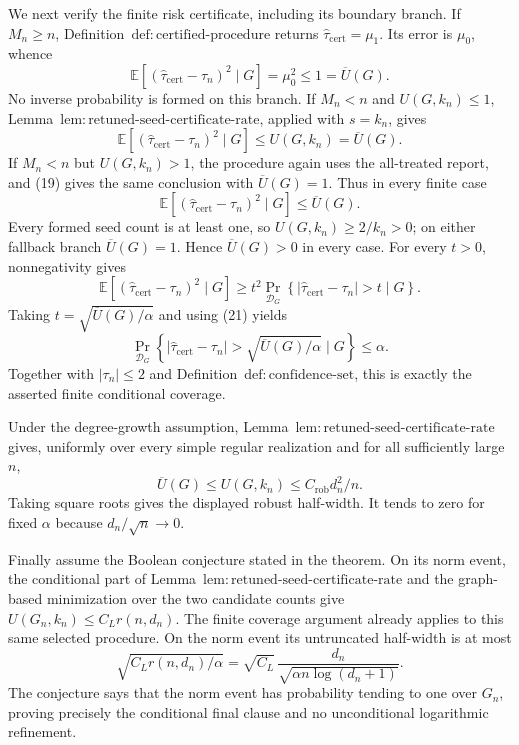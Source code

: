 We next verify the finite risk certificate, including its boundary branch.  If \(M_n\ge n\), Definition~\(\mathrm{def{:}certified\mbox{-}procedure}\) returns \(\widehat\tau_{\mathrm{cert}}=\mu_1\).  Its error is \(\mu_0\), whence
\[
\mathbb E[(\widehat\tau_{\mathrm{cert}}-\tau_n)^2\mid G]
=\mu_0^2\le1=\overline U(G).
\tag{19}
\]
No inverse probability is formed on this branch.  If \(M_n<n\) and \(U(G,k_n)\le1\), Lemma~\(\mathrm{lem{:}retuned\mbox{-}seed\mbox{-}certificate\mbox{-}rate}\), applied with \(s=k_n\), gives
\[
\mathbb E[(\widehat\tau_{\mathrm{cert}}-\tau_n)^2\mid G]
\le U(G,k_n)=\overline U(G).
\tag{20}
\]
If \(M_n<n\) but \(U(G,k_n)>1\), the procedure again uses the all-treated report, and (19) gives the same conclusion with \(\overline U(G)=1\).  Thus in every finite case
\[
\mathbb E[(\widehat\tau_{\mathrm{cert}}-\tau_n)^2\mid G]
\le\overline U(G).
\tag{21}
\]
Every formed seed count is at least one, so \(U(G,k_n)\ge2/k_n>0\); on either fallback branch \(\overline U(G)=1\).  Hence \(\overline U(G)>0\) in every case.
For every \(t>0\), nonnegativity gives
\[
\mathbb E[(\widehat\tau_{\mathrm{cert}}-\tau_n)^2\mid G]
\ge t^2\Pr_{\mathcal D_G}\!\left\{
|\widehat\tau_{\mathrm{cert}}-\tau_n|>t\mid G
\right\}.
\]
Taking \(t=\sqrt{\overline U(G)/\alpha}\) and using (21) yields
\[
\Pr_{\mathcal D_G}\!\left\{
|\widehat\tau_{\mathrm{cert}}-\tau_n|
>\sqrt{\overline U(G)/\alpha}\mid G
\right\}\le\alpha.
\]
Together with \(|\tau_n|\le2\) and Definition~\(\mathrm{def{:}confidence\mbox{-}set}\), this is exactly the asserted finite conditional coverage.

Under the degree-growth assumption, Lemma~\(\mathrm{lem{:}retuned\mbox{-}seed\mbox{-}certificate\mbox{-}rate}\) gives, uniformly over every simple regular realization and for all sufficiently large \(n\),
\[
\overline U(G)\le U(G,k_n)
\le C_{\mathrm{rob}}d_n^2/n.
\]
Taking square roots gives the displayed robust half-width.  It tends to zero for fixed \(\alpha\) because \(d_n/\sqrt n\to0\).

Finally assume the Boolean conjecture stated in the theorem.  On its norm event, the conditional part of Lemma~\(\mathrm{lem{:}retuned\mbox{-}seed\mbox{-}certificate\mbox{-}rate}\) and the graph-based minimization over the two candidate counts give
\(U(G_n,k_n)\le C_Lr(n,d_n)\).  The finite coverage argument already applies to this same selected procedure.  On the norm event its untruncated half-width is at most
\[
\sqrt{C_Lr(n,d_n)/\alpha}
=\sqrt{C_L}\,
\frac{d_n}{\sqrt{\alpha n\log(d_n+1)}}.
\]
The conjecture says that the norm event has probability tending to one over \(G_n\), proving precisely the conditional final clause and no unconditional logarithmic refinement.
